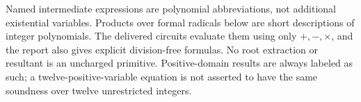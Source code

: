 Named intermediate expressions are polynomial abbreviations, not
additional existential variables.  Products over formal radicals below
are short descriptions of integer polynomials.  The delivered circuits
evaluate them using only $+,-,\times$, and the report also gives explicit
division-free formulas.  No root extraction or resultant is an uncharged
primitive.  Positive-domain results are always labeled as such; a
twelve-positive-variable equation is not asserted to have the same
soundness over twelve unrestricted integers.

